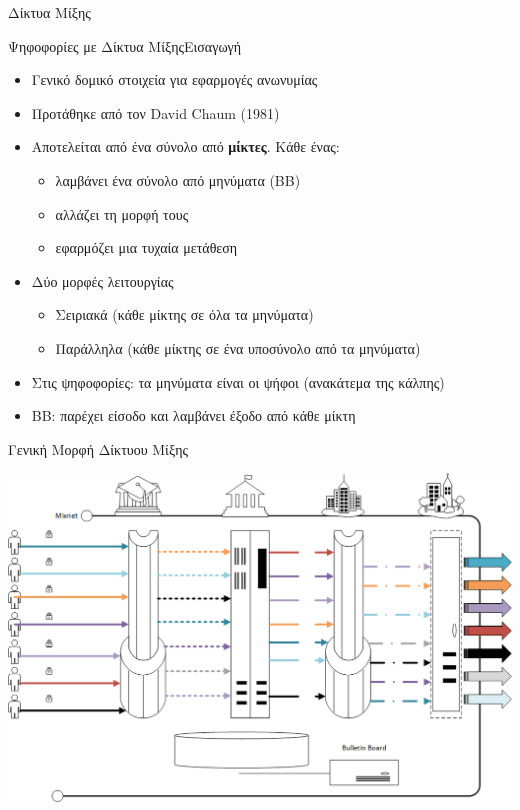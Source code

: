 \documentclass[handout]{beamer}
\begin{document}
\begin{section}{Δίκτυα Μίξης}
\begin{frame}{Ψηφοφορίες με Δίκτυα Μίξης}{Εισαγωγή}
\begin{itemize}
    \item Γενικό δομικό στοιχεία για εφαρμογές ανωνυμίας \pause 
    \item Προτάθηκε από τον David Chaum (1981) \pause 
    \item Αποτελείται από ένα σύνολο από \textbf{μίκτες}. Κάθε ένας:
    \begin{itemize} \pause 
        \item λαμβάνει ένα σύνολο από μηνύματα (ΒΒ)
        \item αλλάζει τη μορφή τους
        \item εφαρμόζει μια τυχαία μετάθεση
    \end{itemize}
    \item Δύο μορφές λειτουργίας \pause 
    \begin{itemize}
        \item Σειριακά (κάθε μίκτης σε όλα τα μηνύματα)
        \item Παράλληλα (κάθε μίκτης σε ένα υποσύνολο από τα μηνύματα)
    \end{itemize} \pause 
    \item Στις ψηφοφορίες: τα μηνύματα είναι οι ψήφοι (ανακάτεμα της κάλπης)
    \item BB: παρέχει είσοδο και λαμβάνει έξοδο από κάθε μίκτη
\end{itemize}
\end{frame}

\begin{frame}{Γενική Μορφή Δίκτυου Μίξης}
    \begin{center}
        \includegraphics[scale=0.35]{mix.PNG}
    \end{center}
\end{frame}


\end{section}
\end{document}
